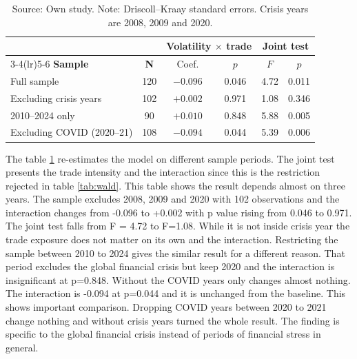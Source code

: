 \begin{table}[H]
    \centering
    \caption{Sensitivity to the sample period.}
    \vspace{\baselineskip}
    \begin{tabular}{lccccc}
        \toprule
        & & \multicolumn{2}{c}{Volatility $\times$ trade} & \multicolumn{2}{c}{Joint test} \\
        \cmidrule(lr){3-4}\cmidrule(lr){5-6}
        \textbf{Sample} & \textbf{N} & Coef. & $p$ & $F$ & $p$ \\
        \midrule
        Full sample                     & 120 & $-0.096$ & 0.046 & 4.72  & 0.011 \\
        Excluding crisis years          & 102 & $+0.002$ & 0.971 & 1.08  & 0.346 \\
        2010--2024 only                 &  90 & $+0.010$ & 0.848 & 5.88  & 0.005 \\
        Excluding COVID (2020--21)      & 108 & $-0.094$ & 0.044 & 5.39  & 0.006 \\
        \bottomrule
    \end{tabular}
    \vspace{\baselineskip}
    \caption*{\footnotesize Source: Own study. Note: Driscoll--Kraay standard errors. Crisis years are 2008, 2009 and 2020.}
    \label{tab:robust_period}
\end{table}

The table \ref{tab:robust_period} re-estimates the model on different sample periods.
The joint test presents the trade intensity and the interaction since this is the restriction rejected in table \ref{tab:wald}.
This table shows the result depends almost on three years.
The sample excludes 2008, 2009 and 2020 with 102 observations and the interaction changes from -0.096 to +0.002 with p value rising from 0.046 to 0.971.
The joint test falls from F = 4.72 to F=1.08.
While it is not inside crisis year the trade exposure does not matter on its own and the interaction.
Restricting the sample between 2010 to 2024 gives the similar result for a different reason.
That period excludes the global financial crisis but keep 2020 and the interaction is insignificant at p=0.848.
Without the COVID years only changes almost nothing.
The interaction is -0.094 at p=0.044 and it is unchanged from the baseline.
This shows important comparison.
Dropping COVID years between 2020 to 2021 change nothing and without crisis years turned the whole result.
The finding is specific to the global financial crisis instead of periods of financial stress in general.

